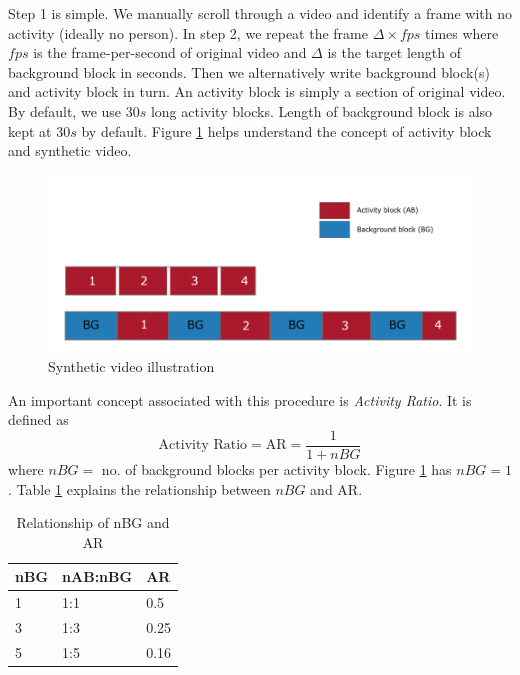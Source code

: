 Step 1 is simple. We manually scroll through a video and identify a frame with no activity (ideally no person). In step 2, we repeat the frame $\Delta \times fps$ times where $fps$ is the frame-per-second of original video and $\Delta$ is the target length of background block in seconds. Then we alternatively write background block(s) and activity block in turn. An activity block is simply a section of original video. By default, we use $30s$ long activity blocks. Length of background block is also kept at $30s$ by default. Figure \ref{fig:synthetic-video} helps understand the concept of activity block and synthetic video.  

\begin{figure}
    \centering
    \includegraphics[width=\linewidth]{images/synthetic-video.PNG}
    \caption{Synthetic video illustration}
    \label{fig:synthetic-video}
\end{figure}

An important concept associated with this procedure is \textit{Activity Ratio}. It is defined as 
$$ \text{Activity Ratio} = \text{AR} = \frac{1}{1+nBG} $$
where $nBG=$ no. of background blocks per activity block. Figure \ref{fig:synthetic-video} has $nBG=1$. Table \ref{table:activity-ratio} explains the relationship between $nBG$ and AR. 


\begin{table}
\centering
\caption{Relationship of nBG and AR} \vspace{5pt}
\label{table:activity-ratio}
\begin{tabular}{@{}| l | l | l | @{}} \hline
nBG & nAB:nBG & AR   \\ \hline \hline
1   & 1:1     & 0.5  \\
3   & 1:3     & 0.25 \\
5   & 1:5     & 0.16 \\ \hline
\end{tabular}
\end{table}

